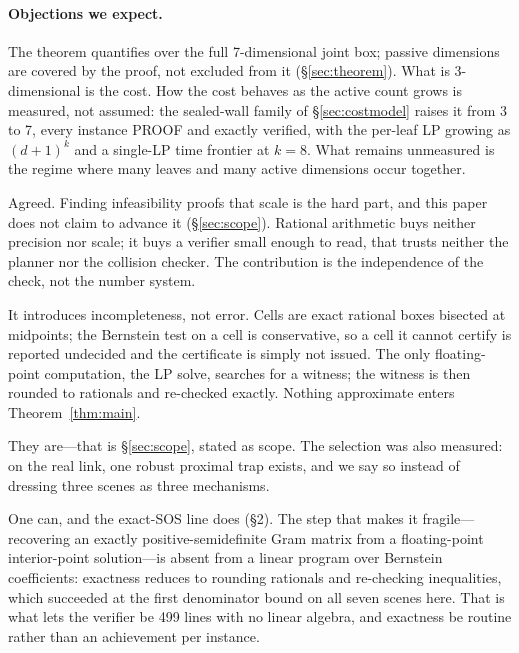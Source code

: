 \documentclass[10pt,twocolumn,letterpaper]{article}
\newcommand{\vone}[1]{#1}  %
\begin{document}
\paragraph{Objections we expect.}
\begin{description}[style=nextline,font=\itshape]
\item[``This is 3-DOF in disguise.''] The theorem quantifies over the full 7-dimensional joint box; passive dimensions are covered by the proof, not excluded from it (\S\ref{sec:theorem}). What is 3-dimensional is the cost. \vone{How the cost behaves as the active count grows is measured, not assumed: the sealed-wall family of \S\ref{sec:costmodel} raises it from 3 to 7, every instance PROOF and exactly verified, with the per-leaf LP growing as $(d+1)^k$ and a single-LP time frontier at $k=8$. What remains unmeasured is the regime where many leaves and many active dimensions occur together.}
\item[``Rational arithmetic is not the hard part.''] \vone{Agreed. Finding infeasibility proofs that scale is the hard part, and this paper does not claim to advance it (\S\ref{sec:scope}). Rational arithmetic buys neither precision nor scale; it buys a verifier small enough to read, that trusts neither the planner nor the collision checker. The contribution is the independence of the check, not the number system.}
\item[``An approximate decomposition must introduce error.''] \vone{It introduces incompleteness, not error. Cells are exact rational boxes bisected at midpoints; the Bernstein test on a cell is conservative, so a cell it cannot certify is reported undecided and the certificate is simply not issued. The only floating-point computation, the LP solve, searches for a witness; the witness is then rounded to rationals and re-checked exactly. Nothing approximate enters Theorem~\ref{thm:main}.}
\item[``The scenes are chosen to work.''] They are---that is \S\ref{sec:scope}, stated as scope. The selection was also measured: on the real link, one robust proximal trap exists, and we say so instead of dressing three scenes as three mechanisms.
\item[``Why not rationalize an SOS certificate?''] One can, and the exact-SOS line does (\S2). The step that makes it fragile---recovering an exactly positive-semidefinite Gram matrix from a floating-point interior-point solution---is absent from a linear program over Bernstein coefficients: exactness reduces to rounding rationals and re-checking inequalities, which succeeded at the first denominator bound on all seven scenes here. That is what lets the verifier be 499 lines with no linear algebra, and exactness be routine rather than an achievement per instance.

\end{description}
\end{document}
